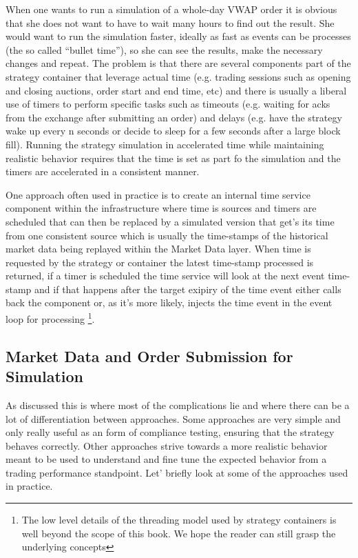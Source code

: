 When one wants to run a simulation of a whole-day VWAP order it is obvious that she does not want to have to wait many hours to find out the result. She would want to run the simulation faster, ideally as fast as events can be processes (the so called ``bullet time''), so she can see the results, make the necessary changes and repeat. The problem is that there are several components part of the strategy container that leverage actual time (e.g. trading sessions such as opening and closing auctions, order start and end time, etc) and there is usually a liberal use of timers to perform specific tasks such as timeouts (e.g. waiting for acks from the exchange after submitting an order) and delays (e.g. have the strategy wake up every n seconds or decide to sleep for a few seconds after a large block fill). Running the strategy simulation in accelerated time while maintaining realistic behavior requires that the time is set as part fo the simulation and the timers are accelerated in a consistent manner.


One approach often used in practice is to create an internal time service component within the infrastructure where time is sources and timers are scheduled that can then be replaced by a simulated version that get's its time from one consistent source which is usually the time-stamps of the historical market data being replayed within the Market Data layer. When time is requested by the strategy or container the latest time-stamp processed is returned, if a timer is scheduled the time service will look at the next event time-stamp and if that happens after the target exipiry of the time event either calls back the component or, as it's more likely, injects the time event in the event loop for processing \footnote{The low level details of the threading model used by strategy containers is well beyond the scope of this book. We hope the reader can still grasp the underlying concepts}.



\subsection{Market Data and Order Submission for Simulation}

As discussed this is where most of the complications lie and where there can be a lot of differentiation between approaches. Some approaches are very simple and only really useful as an form of compliance testing, ensuring that the strategy behaves correctly. Other approaches strive towards a more realistic behavior meant to be used to understand and fine tune the expected behavior from a trading performance standpoint. Let' briefly look at some of the approaches used in practice.



